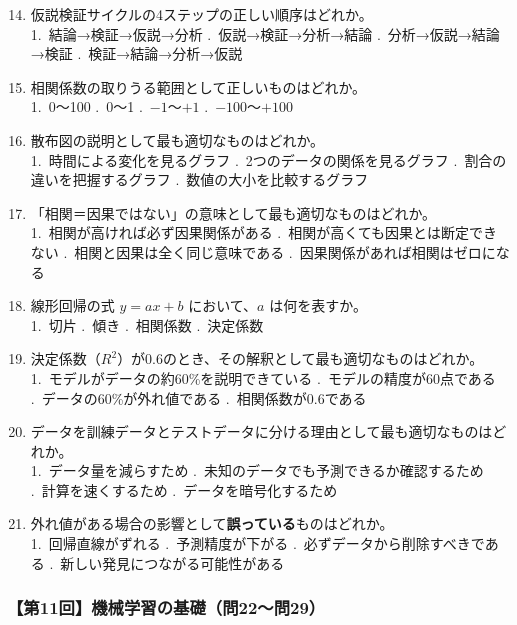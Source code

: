 \documentclass[b4paper,7pt,twocolumn,landscape]{jsarticle}
\begin{document}
\begin{enumerate}
\setcounter{enumi}{13}
\item 仮説検証サイクルの4ステップの正しい順序はどれか。\\
1.~結論→検証→仮説→分析 .~仮説→検証→分析→結論 .~分析→仮説→結論→検証 .~検証→結論→分析→仮説

\item 相関係数の取りうる範囲として正しいものはどれか。\\
1.~0〜100 .~0〜1 .~$-1$〜$+1$ .~$-100$〜$+100$

\item 散布図の説明として最も適切なものはどれか。\\
1.~時間による変化を見るグラフ .~2つのデータの関係を見るグラフ .~割合の違いを把握するグラフ .~数値の大小を比較するグラフ

\item 「相関＝因果ではない」の意味として最も適切なものはどれか。\\
1.~相関が高ければ必ず因果関係がある .~相関が高くても因果とは断定できない .~相関と因果は全く同じ意味である .~因果関係があれば相関はゼロになる

\item 線形回帰の式 $y = ax + b$ において、$a$ は何を表すか。\\
1.~切片 .~傾き .~相関係数 .~決定係数

\item 決定係数（$R^2$）が0.6のとき、その解釈として最も適切なものはどれか。\\
1.~モデルがデータの約60\%を説明できている .~モデルの精度が60点である .~データの60\%が外れ値である .~相関係数が0.6である

\item データを訓練データとテストデータに分ける理由として最も適切なものはどれか。\\
1.~データ量を減らすため .~未知のデータでも予測できるか確認するため .~計算を速くするため .~データを暗号化するため

\item 外れ値がある場合の影響として\textbf{誤っている}ものはどれか。\\
1.~回帰直線がずれる .~予測精度が下がる .~必ずデータから削除すべきである .~新しい発見につながる可能性がある
\end{enumerate}

\subsubsection*{【第11回】機械学習の基礎（問22〜問29）}
\end{document}
